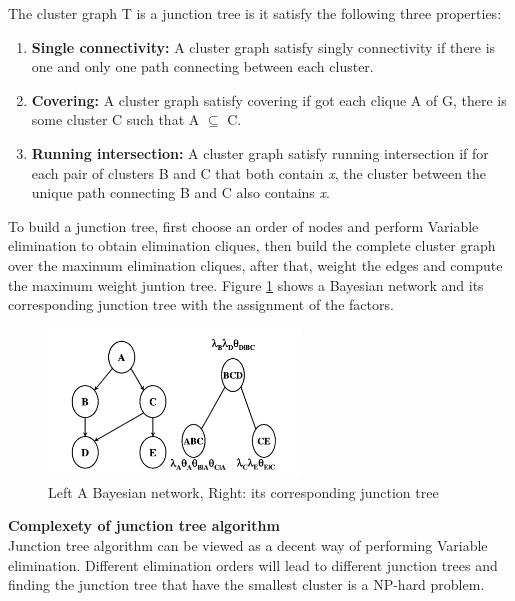         \noindent The cluster graph T is a junction tree is it satisfy the following three properties:
        
        \begin{enumerate}
            \item \textbf{Single connectivity:} A cluster graph satisfy singly connectivity if there is one and only one path connecting between each cluster.
            \item \textbf{Covering:} A cluster graph satisfy covering if got each clique A of G, there is some cluster C such that A $\subseteq$ C.
            \item \textbf{Running intersection:}  A cluster graph satisfy  running intersection if for each pair of clusters B and C that both contain \textit{x}, the cluster between the unique path connecting B and C also contains \textit{x}.
        \end{enumerate}
        
        \noindent To build a junction tree, first choose an order of nodes and perform Variable elimination to obtain elimination cliques, then build the complete cluster graph over the maximum elimination cliques, after that, weight the edges and compute the maximum weight juntion tree.
        Figure \ref{fig:bayesjunc} shows a Bayesian network and its corresponding junction tree with the assignment of the factors.\\
        
        \begin{figure}
            \centering
            \includegraphics[width = 0.6\textwidth, height = 0.3\textwidth]{pic/bayesandjunctree.png}
            \caption{Left A Bayesian network, Right: its corresponding junction tree}
            \label{fig:bayesjunc}
        \end{figure}
        
        \noindent \textbf{Complexety of junction tree algorithm}\\
        
        \noindent Junction tree algorithm can be viewed as a decent way of performing Variable elimination. Different elimination orders will lead to different junction trees and finding the junction tree that have the smallest cluster is a NP-hard problem.\\
        
